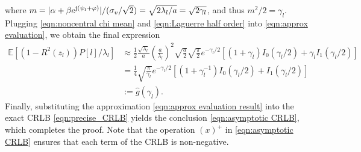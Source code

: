 \documentclass[journal,twocolumn]{IEEEtran}
\theoremstyle{nonumberplain}
\begin{document}
    where $m=\lvert\alpha + \beta e^{{\rm j} (\psi_l + \varphi)}\rvert/(\sigma_v / \sqrt{2}) = \sqrt{2\lambda_l/a} = \sqrt{2\gamma_l}$, and thus $m^2/2=\gamma_l$. Plugging \eqref{eqn:noncentral chi mean} and \eqref{eqn:Laguerre half order} into \eqref{eqn:approx evaluation}, we obtain the final expression 
    \begin{equation}
        \begin{aligned}
        \mathbb{E}[(1-R^2(z_l))P[l]/\lambda_l] & \approx \frac{1}{2}\frac{\sqrt{\lambda_l}}{a}\left(\frac{a}{\lambda_l}\right)^2 \sqrt{\frac{a}{2}} \sqrt{\frac{\pi}{2}} e^{-\gamma_l/2}\left[(1+\gamma_l)I_0(\gamma_l/2)+\gamma_l I_1(\gamma_l/2)\right] \\
        & = \frac{1}{4}\sqrt{\frac{\pi}{\gamma_l}}e^{-\gamma_l/2}\left[(1+\gamma_l^{-1})I_0(\gamma_l/2)+ I_1(\gamma_l/2)\right] \\
        & := \hat{g}(\gamma_l).
        \end{aligned}
        \label{eqn:approx evaluation result}
    \end{equation}
    Finally, substituting the approximation \eqref{eqn:approx evaluation result} into the exact CRLB \eqref{eqn:precise_CRLB} yields the conclusion \eqref{eqn:asymptotic CRLB}, which completes the proof. Note that the operation $(x)^+$ in \eqref{eqn:asymptotic CRLB} ensures that each term of the CRLB is non-negative. 
\end{document}

